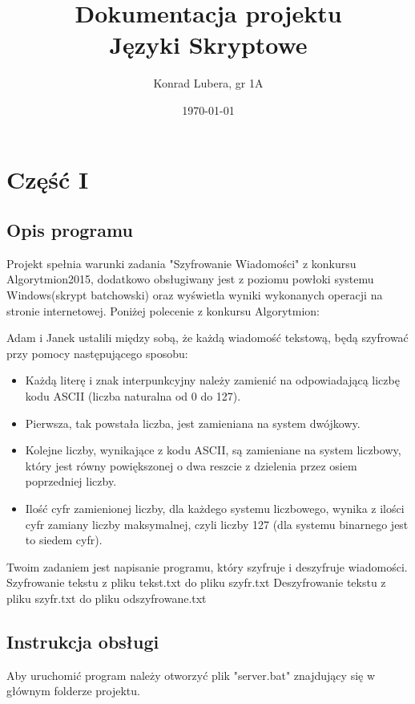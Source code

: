 \documentclass[12pt,a4paper]{article}
\begin{document}
	
	\title{Dokumentacja projektu\\ Języki Skryptowe}
	\author{Konrad Lubera, gr 1A}
	\date{\today}
	
	\maketitle
	\newpage
	\section*{Część I}
	\subsection*{Opis programu}
	 Projekt spełnia warunki zadania "Szyfrowanie Wiadomości" z konkursu Algorytmion2015, dodatkowo obsługiwany jest z poziomu powłoki systemu Windows(skrypt batchowski) oraz wyświetla wyniki wykonanych operacji na stronie internetowej. 
	 \newline
	\newline Poniżej polecenie z konkursu Algorytmion:
	
	Adam i Janek ustalili między sobą, że każdą wiadomość tekstową, będą szyfrować przy pomocy następującego sposobu:
	\begin{itemize}
	\item   Każdą literę i znak interpunkcyjny należy zamienić na odpowiadającą liczbę kodu ASCII (liczba naturalna od 0 do 127).
	\item Pierwsza, tak powstała liczba, jest zamieniana na system dwójkowy.
	\item Kolejne liczby, wynikające z kodu ASCII, są zamieniane na system liczbowy, który jest równy powiększonej o dwa reszcie z dzielenia przez osiem poprzedniej liczby.
	\item  Ilość cyfr zamienionej liczby, dla każdego systemu liczbowego, wynika z ilości cyfr zamiany liczby maksymalnej, czyli liczby 127 (dla systemu binarnego jest to siedem cyfr). 
	\end{itemize}
	Twoim zadaniem jest napisanie programu, który szyfruje i deszyfruje wiadomości. \newline
Szyfrowanie tekstu z pliku tekst.txt do pliku szyfr.txt \newline Deszyfrowanie tekstu z pliku szyfr.txt do pliku odszyfrowane.txt 

	\subsection*{Instrukcja obsługi}
	Aby uruchomić program należy otworzyć plik "server.bat" znajdujący się w głównym folderze projektu.
	
\end{document}
